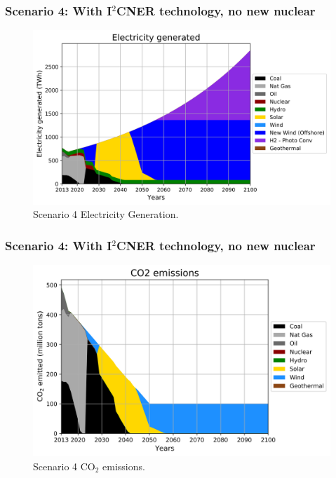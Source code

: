 \begin{frame}
  \frametitle{Scenario 4: With I$^2$CNER technology, no new nuclear}
  \begin{figure}[htbp!]
    \begin{center}
      \includegraphics[scale=0.5]{./images/i2cner_nonuc_elc}
    \end{center}
          \caption{Scenario 4 Electricity Generation.}
    \label{s4e}
  \end{figure}
\end{frame}

\begin{frame}
  \frametitle{Scenario 4: With I$^2$CNER technology, no new nuclear}
  \begin{figure}[htbp!]
    \begin{center}
      \includegraphics[scale=0.5]{./images/i2cner_nonuc_co2}
    \end{center}
          \caption{Scenario 4 CO$_2$ emissions.}
    \label{s4c}
  \end{figure}

\end{frame}